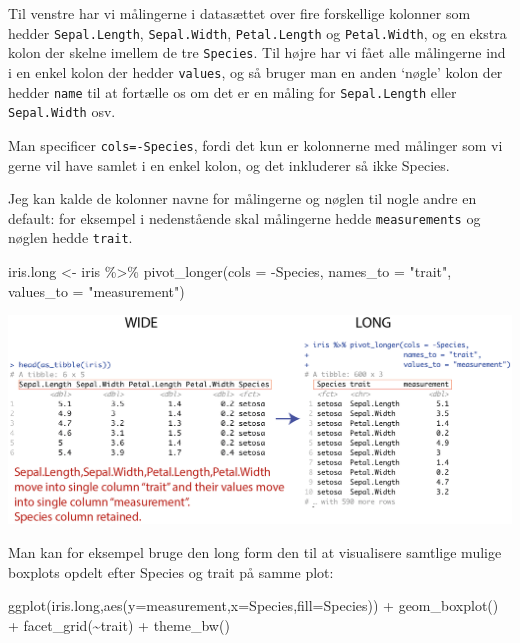 \documentclass[
]{book}
\newenvironment{Shaded}{\begin{snugshade}}{\end{snugshade}}
\newcommand{\AttributeTok}[1]{\textcolor[rgb]{0.77,0.63,0.00}{#1}}
\newcommand{\FunctionTok}[1]{\textcolor[rgb]{0.00,0.00,0.00}{#1}}
\newcommand{\NormalTok}[1]{#1}
\newcommand{\OtherTok}[1]{\textcolor[rgb]{0.56,0.35,0.01}{#1}}
\newcommand{\SpecialCharTok}[1]{\textcolor[rgb]{0.00,0.00,0.00}{#1}}
\newcommand{\StringTok}[1]{\textcolor[rgb]{0.31,0.60,0.02}{#1}}
\begin{document}
Til venstre har vi målingerne i datasættet over fire forskellige kolonner som hedder \texttt{Sepal.Length}, \texttt{Sepal.Width}, \texttt{Petal.Length} og \texttt{Petal.Width}, og en ekstra kolon der skelne imellem de tre \texttt{Species}. Til højre har vi fået alle målingerne ind i en enkel kolon der hedder \texttt{values}, og så bruger man en anden `nøgle' kolon der hedder \texttt{name} til at fortælle os om det er en måling for \texttt{Sepal.Length} eller \texttt{Sepal.Width} osv.

Man specificer \texttt{cols=-Species}, fordi det kun er kolonnerne med målinger som vi gerne vil have samlet i en enkel kolon, og det inkluderer så ikke Species.

Jeg kan kalde de kolonner navne for målingerne og nøglen til nogle andre en default: for eksempel i nedenstående skal målingerne hedde \texttt{measurements} og nøglen hedde \texttt{trait}.

\begin{Shaded}
\begin{Highlighting}[]
\NormalTok{iris.long }\OtherTok{\textless{}{-}}\NormalTok{ iris }\SpecialCharTok{\%\textgreater{}\%} \FunctionTok{pivot\_longer}\NormalTok{(}\AttributeTok{cols =} \SpecialCharTok{{-}}\NormalTok{Species,}
                                    \AttributeTok{names\_to =} \StringTok{"trait"}\NormalTok{,}
                                    \AttributeTok{values\_to =} \StringTok{"measurement"}\NormalTok{)}
\end{Highlighting}
\end{Shaded}

\includegraphics[width=1\linewidth]{plots/wide_to_long_names}

Man kan for eksempel bruge den long form den til at visualisere samtlige mulige boxplots opdelt efter Species og trait på samme plot:

\begin{Shaded}
\begin{Highlighting}[]
\FunctionTok{ggplot}\NormalTok{(iris.long,}\FunctionTok{aes}\NormalTok{(}\AttributeTok{y=}\NormalTok{measurement,}\AttributeTok{x=}\NormalTok{Species,}\AttributeTok{fill=}\NormalTok{Species)) }\SpecialCharTok{+} 
  \FunctionTok{geom\_boxplot}\NormalTok{() }\SpecialCharTok{+} 
  \FunctionTok{facet\_grid}\NormalTok{(}\SpecialCharTok{\textasciitilde{}}\NormalTok{trait) }\SpecialCharTok{+}
  \FunctionTok{theme\_bw}\NormalTok{()}
\end{Highlighting}
\end{Shaded}
\end{document}
